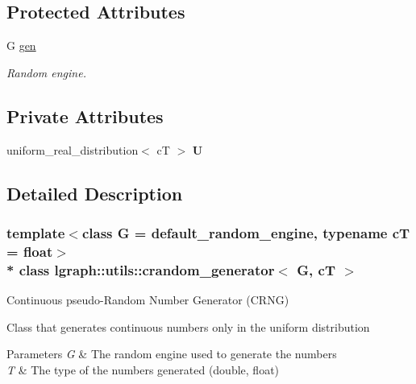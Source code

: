 \subsection*{Protected Attributes}
\begin{DoxyCompactItemize}
\item 
G \hyperlink{classlgraph_1_1utils_1_1random__generator_a18353876b4c2d3a18aee454b5750a0a0}{gen}\hypertarget{classlgraph_1_1utils_1_1random__generator_a18353876b4c2d3a18aee454b5750a0a0}{}\label{classlgraph_1_1utils_1_1random__generator_a18353876b4c2d3a18aee454b5750a0a0}

\begin{DoxyCompactList}\small\item\em Random engine. \end{DoxyCompactList}\end{DoxyCompactItemize}
\subsection*{Private Attributes}
\begin{DoxyCompactItemize}
\item 
uniform\+\_\+real\+\_\+distribution$<$ cT $>$ {\bfseries U}\hypertarget{classlgraph_1_1utils_1_1crandom__generator_a0765c913cb0aa5418689ace83b14479b}{}\label{classlgraph_1_1utils_1_1crandom__generator_a0765c913cb0aa5418689ace83b14479b}

\end{DoxyCompactItemize}


\subsection{Detailed Description}
\subsubsection*{template$<$class G = default\+\_\+random\+\_\+engine, typename cT = float$>$\\*
class lgraph\+::utils\+::crandom\+\_\+generator$<$ G, c\+T $>$}

Continuous pseudo-\/\+Random Number Generator (C\+R\+NG) 

Class that generates continuous numbers only in the uniform distribution


\begin{DoxyParams}{Parameters}
{\em G} & The random engine used to generate the numbers \\
\hline
{\em T} & The type of the numbers generated (double, float) \\
\hline
\end{DoxyParams}


